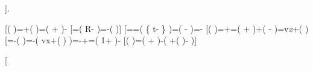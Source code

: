 \documentclass[11pt]{article}
\begin{document}
{]}.

{[}\left(
\right)=+\left(
 \right)=\left(
+
\right)-\frac{\partial K}{\partial x}{]}
{[}=\left(
R-
\right)=-\left(
\cdot {} \right){]}
{[}==\left(
\left\{ t- \right\}
\right)=\left(
-
\right)=-\frac{{{R}_{x}}}{K}{]}
{[}\left(
\cdot {}
\right)=+=\left(
+
\right)+\left(
-
\right)={{v}\emph{{x}}+\left(
\right)\frac{{{R}_{x}}}{K}{]}
{[}=-\left(
\cdot {}
\right)=-\left( {{v}}{x}}+\left(
\right)
\right)=-+=\left(
1+
\right)-\frac{{{v}_{x}}}{c}{]} {[}\left(
 \right)=\left(
+
\right)-\left(
+\left(
\right)- \right){]}

{[}
\end{document}

